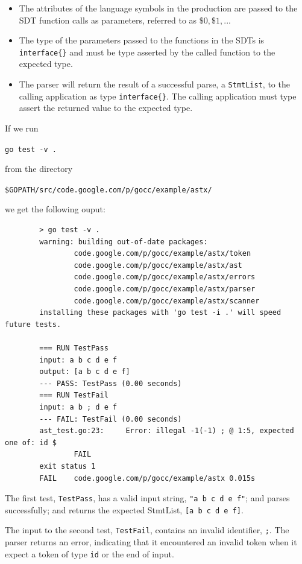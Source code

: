 \documentclass[12pt]{article}
\begin{document}
	\begin{itemize}
		\item The attributes of the language symbols in the production are passed to the SDT function calls as parameters, referred to as $\$0, \$1, ...$

		\item The type of the parameters passed to the functions in the SDTs is \verb|interface{}| and must be type asserted by the called function to the expected type.

		\item The parser will return the result of a successful parse, a \verb"StmtList", to the calling application as type \verb"interface{}". The calling application must type assert the returned value to the expected type.
	\end{itemize}

	If we run 

	\verb"go test -v ." 

	from the directory 

	\verb|$GOPATH/src/code.google.com/p/gocc/example/astx/| 

	we get the following ouput:

	\begin{verbatim}
		> go test -v .
		warning: building out-of-date packages:
		        code.google.com/p/gocc/example/astx/token
		        code.google.com/p/gocc/example/astx/ast
		        code.google.com/p/gocc/example/astx/errors
		        code.google.com/p/gocc/example/astx/parser
		        code.google.com/p/gocc/example/astx/scanner
		installing these packages with 'go test -i .' will speed future tests.

		=== RUN TestPass
		input: a b c d e f
		output: [a b c d e f]
		--- PASS: TestPass (0.00 seconds)
		=== RUN TestFail
		input: a b ; d e f
		--- FAIL: TestFail (0.00 seconds)
		ast_test.go:23: 	Error: illegal -1(-1) ; @ 1:5, expected one of: id $
		        FAIL
		exit status 1
		FAIL	code.google.com/p/gocc/example/astx	0.015s	\end{verbatim}

	The first test, \verb"TestPass", has a valid input string, \verb|"a b c d e f"|; and parses successfully; and returns the expected StmtList, \verb|[a b c d e f]|.

	The input to the second test, \verb|TestFail|, contains an invalid identifier, \verb|;|. The parser returns an error, indicating that it encountered an invalid token when it expect a token of type \verb|id| or the end of input.
\end{document}
